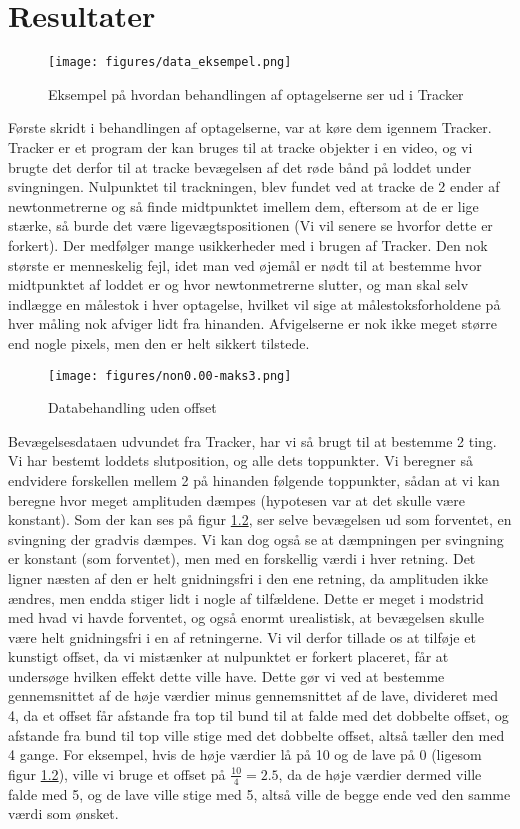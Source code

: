 \chapter{Resultater}
\begin{figure}[htbp]
    \centering
    \texttt{[image: figures/data\_eksempel.png]}
    \caption{Eksempel på hvordan behandlingen af optagelserne ser ud i Tracker}
    \label{fig:tracker}
\end{figure}
Første skridt i behandlingen af optagelserne, var at køre dem igennem Tracker. 
Tracker er et program der kan bruges til at tracke objekter i en video, 
og vi brugte det derfor til at tracke bevægelsen af det røde bånd på loddet under svingningen.
Nulpunktet til trackningen, blev fundet ved at tracke de 2 ender af newtonmetrerne og så finde midtpunktet imellem dem, 
eftersom at de er lige stærke, så burde det være ligevægtspositionen (Vi vil senere se hvorfor dette er forkert).
Der medfølger mange usikkerheder med i brugen af Tracker. Den nok største er menneskelig fejl, 
idet man ved øjemål er nødt til at bestemme hvor midtpunktet af loddet er og hvor newtonmetrerne slutter,
og man skal selv indlægge en målestok i hver optagelse, hvilket vil sige at målestoksforholdene på hver måling nok afviger lidt fra hinanden. 
Afvigelserne er nok ikke meget større end nogle pixels, men den er helt sikkert tilstede.
\begin{figure}[htbp]
    \centering
    \texttt{[image: figures/non0.00-maks3.png]}
    \caption{Databehandling uden offset}
    \label{fig:dårlig_graf}
\end{figure}
Bevægelsesdataen udvundet fra Tracker, har vi så brugt til at bestemme 2 ting. Vi har bestemt loddets slutposition, og alle dets toppunkter. 
Vi beregner så endvidere forskellen mellem 2 på hinanden følgende toppunkter, sådan at vi kan beregne hvor meget amplituden dæmpes (hypotesen var at det skulle være konstant).
Som der kan ses på figur \ref{fig:dårlig_graf}, ser selve bevægelsen ud som forventet, en svingning der gradvis dæmpes. 
Vi kan dog også se at dæmpningen per svingning er konstant (som forventet), men med en forskellig værdi i hver retning. 
Det ligner næsten af den er helt gnidningsfri i den ene retning, da amplituden ikke ændres, men endda stiger lidt i nogle af tilfældene.
Dette er meget i modstrid med hvad vi havde forventet, og også enormt urealistisk, at bevægelsen skulle være helt gnidningsfri i en af retningerne. 
Vi vil derfor tillade os at tilføje et kunstigt offset, da vi mistænker at nulpunktet er forkert placeret, får at undersøge hvilken effekt dette ville have. 
Dette gør vi ved at bestemme gennemsnittet af de høje værdier minus gennemsnittet af de lave, divideret med 4, da et offset får afstande fra top til bund til at falde med det dobbelte offset, 
og afstande fra bund til top ville stige med det dobbelte offset, altså tæller den med 4 gange. For eksempel, hvis de høje værdier lå på 10 og de lave på 0 (ligesom figur \ref{fig:dårlig_graf}),
ville vi bruge et offset på $\frac{10}{4}=2.5$, da de høje værdier dermed ville falde med 5, og de lave ville stige med 5, altså ville de begge ende ved den samme værdi som ønsket.

